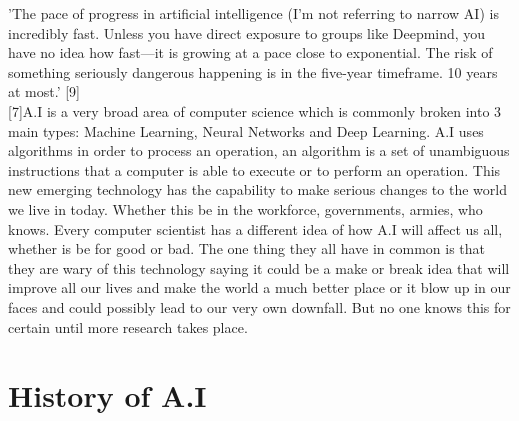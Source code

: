 \documentclass[letterpaper, 10 pt, conference]{ieeeconf}  %
\begin{document}
'The pace of progress in artificial intelligence (I’m not referring to narrow AI) is incredibly fast. Unless you have direct exposure to groups like Deepmind, you have no idea how fast—it is growing at a pace close to exponential. The risk of something seriously dangerous happening is in the five-year timeframe. 10 years at most.' [9]\\

[7]A.I is a very broad area of computer science which is commonly broken into 3 main types: Machine Learning, Neural Networks and Deep Learning. A.I uses algorithms in order to process an operation, an algorithm is a set of unambiguous instructions that a computer is able to execute or to perform an operation. This new emerging technology has the capability to make serious changes to the world we live in today. Whether this be in the workforce, governments, armies, who knows. Every computer scientist has a different idea of how A.I will affect us all, whether is be for good or bad. The one thing they all have in common is that they are wary of this technology saying it could be a make or break idea that will improve all our lives and make the world a much better place or it blow up in our faces and could possibly lead to our very own downfall. But no one knows this for certain until more research takes place.

\section{History of A.I}
\end{document}
